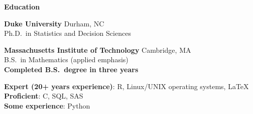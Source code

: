 \documentclass[11pt]{article}
\def\newsectn{\vspace*{0.6cm}}
\def\newitem{\vspace*{0.2cm}}
\begin{document}




\newsectn
{\Large \textbf{Education}}

\textbf{Duke University} \hfill Durham, NC\\
Ph.D.~in Statistics and Decision Sciences %

\newpage
{}



\newitem
\textbf{Massachusetts Institute of Technology} \hfill Cambridge, MA\\
B.S.~in Mathematics (applied emphasis)\\ %
\textbf{Completed B.S.~degree in three years}



\newsectn
{}

\textbf{Expert (20+ years experience)}: R, Linux/UNIX operating systems, LaTeX\\
\textbf{Proficient}: C, SQL, SAS\\
\textbf{Some experience}: Python
\end{document}

